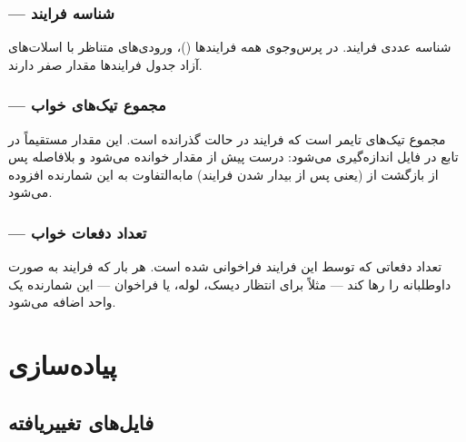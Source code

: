 \documentclass[code]{amznotes-fa}
\begin{document}
\subsection{ — شناسه فرایند}

شناسه عددی فرایند. در پرس‌وجوی همه فرایندها ()، ورودی‌های متناظر با اسلات‌های آزاد جدول فرایندها مقدار صفر دارند.

\subsection{ — مجموع تیک‌های خواب}

مجموع تیک‌های تایمر است که فرایند در حالت  گذرانده است. این مقدار مستقیماً در تابع  در فایل  اندازه‌گیری می‌شود: درست پیش از  مقدار  خوانده می‌شود و بلافاصله پس از بازگشت از  (یعنی پس از بیدار شدن فرایند) مابه‌التفاوت به این شمارنده افزوده می‌شود.

\subsection{ — تعداد دفعات خواب}

تعداد دفعاتی که  توسط این فرایند فراخوانی شده است. هر بار که فرایند به صورت داوطلبانه  را رها کند — مثلاً برای انتظار  دیسک، لوله، یا فراخوان  — این شمارنده یک واحد اضافه می‌شود.

\chapter{پیاده‌سازی}

\section{فایل‌های تغییریافته}
\end{document}
